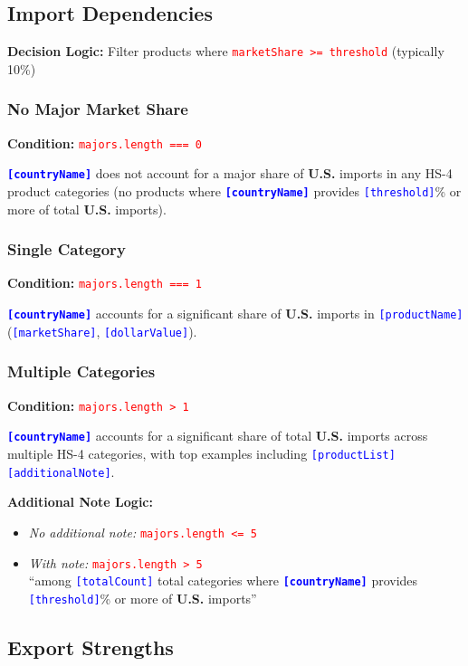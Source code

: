 \documentclass[12pt]{article}
\newcommand{\var}[1]{\textcolor{blue}{\texttt{[#1]}}}
\newcommand{\bold}[1]{\textbf{#1}}
\newcommand{\cond}[1]{\textcolor{red}{\texttt{#1}}}
\begin{document}
\subsection{Import Dependencies}

\textbf{Decision Logic:} Filter products where \cond{marketShare >= threshold} (typically 10\%)

\subsubsection{No Major Market Share}
\textbf{Condition:} \cond{majors.length === 0}

\bold{\var{countryName}} does not account for a major share of \bold{U.S.} imports in any HS-4 product categories (no products where \bold{\var{countryName}} provides \var{threshold}\% or more of total \bold{U.S.} imports).

\subsubsection{Single Category}
\textbf{Condition:} \cond{majors.length === 1}

\bold{\var{countryName}} accounts for a significant share of \bold{U.S.} imports in \var{productName} (\var{marketShare}, \var{dollarValue}).

\subsubsection{Multiple Categories}
\textbf{Condition:} \cond{majors.length > 1}

\bold{\var{countryName}} accounts for a significant share of total \bold{U.S.} imports across multiple HS-4 categories, with top examples including \var{productList}\var{additionalNote}.

\textbf{Additional Note Logic:}
\begin{itemize}[noitemsep]
\item \textit{No additional note:} \cond{majors.length <= 5}
\item \textit{With note:} \cond{majors.length > 5}\\
``among \var{totalCount} total categories where \bold{\var{countryName}} provides \var{threshold}\% or more of \bold{U.S.} imports''
\end{itemize}

\subsection{Export Strengths}
\end{document}

